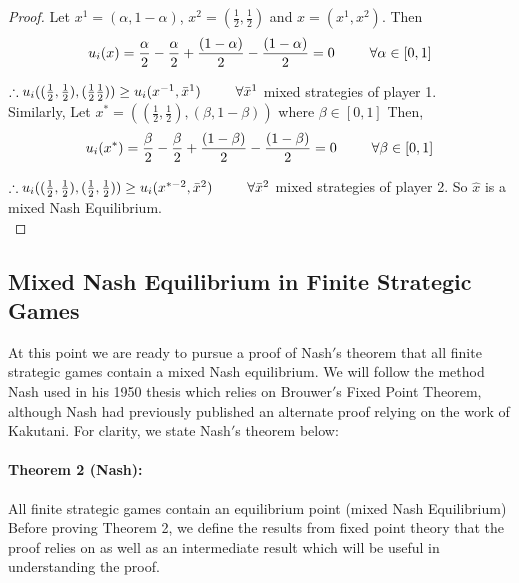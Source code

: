 \documentclass[12pt]{article}
\newcommand{\tab}{\hspace*{25pt}}
\begin{document}
\begin{proof}
Let $x^1 = (\alpha, 1 - \alpha)$, $x^2 = (\frac{1}{2},\frac{1}{2})$ and $ x = (x^1,x^2)$. Then
\begin{equation*}
u_i(x) = \frac{\alpha}{2} - \frac{\alpha}{2} + \frac{(1-\alpha)}{2} - \frac{(1-\alpha)}{2} = 0 \tab \forall \alpha \in [0,1]
\end{equation*} 

$\therefore u_i((\frac{1}{2},\frac{1}{2}), (\frac{1}{2} \frac{1}{2})) \geq u_i(x^{-1},\bar{x}^{1}) \tab \forall \bar{x}^1$ mixed strategies of player 1.\\

Similarly, Let $x^* = ((\frac{1}{2},\frac{1}{2}), (\beta,1-\beta))$ where $\beta \in [0,1]$ Then,
\begin{equation*}
u_i(x^*) = \frac{\beta}{2} - \frac{\beta}{2} + \frac{(1-\beta)}{2} - \frac{(1-\beta)}{2} = 0 \tab \forall \beta \in [0,1]
\end{equation*}

$\therefore u_i((\frac{1}{2},\frac{1}{2}), (\frac{1}{2}, \frac{1}{2})) \geq u_i(x^{*-2},\bar{x}^{2}) \tab \forall \bar{x}^2$ mixed strategies of player 2. So $\hat{x}$ is a mixed Nash Equilibrium.\\ 
\end{proof}

\subsection{Mixed Nash Equilibrium in Finite Strategic Games}

At this point we are ready to pursue a proof of Nash$'$s theorem that all finite strategic games contain a mixed Nash equilibrium. We will follow the method Nash used in his 1950 thesis which relies on Brouwer$'$s Fixed Point Theorem, although Nash had previously published an alternate proof relying on the work of Kakutani. For clarity, we state Nash$'$s theorem below:

\paragraph{Theorem 2 (Nash):} All finite strategic games contain an equilibrium point (mixed Nash Equilibrium)\\

Before proving Theorem 2, we define the results from fixed point theory that the proof relies on as well as an intermediate result which will be useful in understanding the proof.
\end{document}
